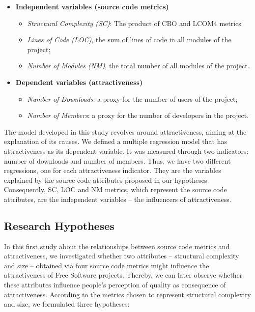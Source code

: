 \documentclass[conference]{IEEEtran}
\begin{document}
\begin{itemize}
\item \textbf{Independent variables (source code metrics)}
%
\begin{itemize}
\item \emph{Structural Complexity (SC)}: The product of CBO and LCOM4 metrics
%
\item \emph{Lines of Code (LOC)}, the sum of lines of code in all modules of the
project;
%
\item \emph{Number of Modules (NM)}, the total number of all modules of the project.
\end{itemize}

\item \textbf{Dependent variables (attractiveness)}
\begin{itemize}
\item \emph{Number of Downloads}: a proxy for the number of users of the
project;
%
\item \emph{Number of Members}: a proxy for the number of developers in the
project.
\end{itemize}
\end{itemize}

The model developed in this study revolves around attractiveness,
aiming at the explanation of its causes.
%
We defined a multiple regression model that has attractiveness as its dependent
variable. 
It was measured through two indicators: number of downloads and number of members. 
Thus, we have two different regressions, one for each attractiveness indicator.
%
They are the variables explained by the source code attributes proposed in our hypotheses.
%
Consequently, SC, LOC and NM metrics, which represent the source code attributes,
are the independent variables -- the influencers of attractiveness.


\subsection{Research Hypotheses} 
\label{hypotheses}

In this first study about the relationships between source code metrics and
attractiveness, we investigated whether two attributes -- structural complexity
and size -- obtained via four source code metrics might influence the attractiveness
of Free Software projects.
%
Thereby, we can later observe whether these attributes influence people's 
perception of quality as consequence of attractiveness.
%
According to the metrics chosen to represent structural
complexity and size, we formulated three hypotheses:
\end{document}
